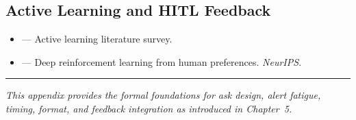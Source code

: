 \subsection*{Active Learning and HITL Feedback}
\begin{itemize}
    \item \textcite{settles2009active} --- Active learning literature survey.
    \item \textcite{christiano2017deep} --- Deep reinforcement learning from human preferences. \emph{NeurIPS}.
\end{itemize}

\bigskip
\begin{center}
\rule{0.5\textwidth}{0.4pt}
\end{center}
\bigskip

\noindent\textit{This appendix provides the formal foundations for ask design, alert fatigue, timing, format, and feedback integration as introduced in Chapter~5.}
\apxnumoff
